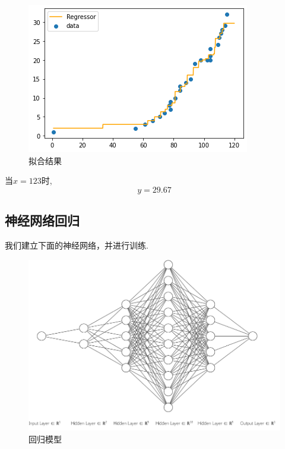 \begin{figure}[H]
	\centering
	\includegraphics[scale=0.55,angle=0]{images/11.png}
	\caption{拟合结果}
	\label{11}
\end{figure}

当$x=123$时,$$y=29.67$$


\subsection{神经网络回归}
我们建立下面的神经网络，并进行训练.

\begin{figure}[H]
	\centering
	\includegraphics[scale=0.4,angle=0]{images/12.png}
	\caption{回归模型}
	\label{12}
\end{figure}

